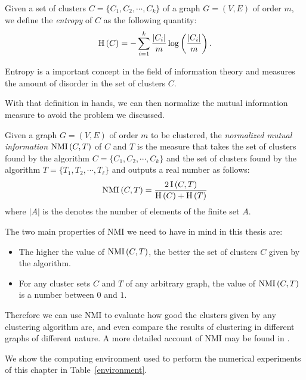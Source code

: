 \begin{definition}
   Given a set of clusters $C = \{C_1, C_2, \cdots, C_k \}$ of a graph $G=(V,E)$ of order $m$, we define the \textit{entropy} of $C$ as the following quantity:
\begin{equation}
   \operatorname{H\,} (C) = - \sum_{i=1}^k \frac{|C_i|}{m} \log \left( \frac{|C_i|}{m} \right) .
   \end{equation}
\end{definition}

Entropy is a important concept in the field of information theory and measures the amount of disorder in the set of clusters $C$.  

With that definition in hands, we can then normalize the mutual information measure to avoid the problem we discussed.

\begin{definition}
   Given a graph $G = (V,E)$ of order $m$ to be clustered, the \textit{normalized mutual information} $\operatorname{NMI\,} (C, T)$ of $C$ and $T$ is the measure that takes the set of clusters found by the algorithm $C = \{ C_1, C_2, \cdots, C_k \}$ and the set of clusters found by the algorithm $T = \{ T_1, T_2, \cdots, T_\ell \}$ and outputs a real number as follows:
\begin{equation}
   \operatorname{NMI\,} (C,T) = \frac{2\operatorname{I\,} (C,T)}{\operatorname{H\,} (C) + \operatorname{H\,} (T)}
\end{equation}
where $|A|$ is the denotes the number of elements of the finite set $A$.
\end{definition}

The two main properties of NMI we need to have in mind in this thesis are:

\begin{itemize}
   \item The higher the value of $\operatorname{NMI\,} (C,T)$, the better the set of clusters $C$ given by the algorithm.
   \item For any cluster sets $C$ and $T$ of any arbitrary graph, the value of $\operatorname{NMI\,} (C,T)$ is a number between $0$ and $1$. 
\end{itemize}

Therefore we can use NMI to evaluate how good the clusters given by any clustering algorithm are, and even compare the results of clustering in different graphs of different nature.
A more detailed account of NMI may be found in \cite{nmi}.

We show the computing environment used to perform the numerical experiments of this chapter in Table~\vref{environment}.

